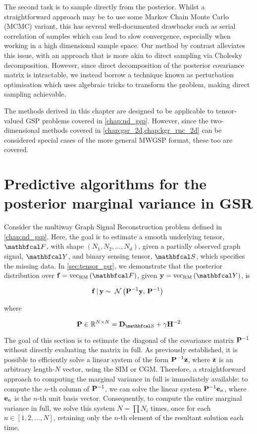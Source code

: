 The second task is to sample directly from the posterior. Whilst a straightforward approach may be to use some Markov Chain Monte Carlo (MCMC) variant, this has sevreal well-documented drawbacks such as serial correlation of samples which can lead to slow convergence, especially when working in a high dimensional sample space. Our method by contrast alleviates this issue, with an approach that is more akin to direct sampling via Cholesky decomposition. However, since direct decomposition of the posterior covariance matrix is intractable, we instead borrow a technique known as perturbation optimisation which uses algebraic tricks to transform the problem, making direct sampling achievable. 

The methods derived in this chapter are designed to be applicable to tensor-valued GSP problems covered in \cref{chap:nd_gsp}. However, since the two-dimensional methods covered in \cref{chap:gsr_2d,chap:kgr_rnc_2d} can be considered special cases of the more general MWGSP format, these too are covered. 

\section{Predictive algorithms for the posterior marginal variance in GSR}

Consider the multiway Graph Signal Reconstruction problem defined in \cref{chap:nd_gsp}. Here, the goal is to estimate a smooth underlying tensor, $\Ft$, with shape $(N_1, N_2, ..., N_d)$, given a partially observed graph signal, $\Yt$, and binary sensing tensor, $\St$, which specifies the missing data. In \cref{sec:tensor_gsr}, we demonstrate that the posterior distribution over $\f = \vecrm{\Ft}$, given $\y = \vecrm{\Yt}$, is

\begin{equation}
    \mathbf{f} \, | \, \mathbf{y} \sim \; \mathcal{N}\left(\mathbf{P}^{-1} \mathbf{y}, \, \mathbf{P}^{-1}\right) \;
\end{equation}

where 

\begin{equation}
    \PP \in \R^{N \times N} = \D_{\St} + \gamma \HH^{-2}
\end{equation}

The goal of this section is to estimate the diagonal of the covariance matrix $\mathbf{P}^{-1}$ without directly evaluating the matrix in full. As previously established, it is possible to efficiently solve a linear system of the form $\mathbf{P}^{-1} \mathbf{z}$, where $\mathbf{z}$ is an arbitrary length-$N$ vector, using the SIM or CGM. Therefore, a straightforward approach to computing the marginal variance in full is immediately available: to compute the $n$-th column of $\mathbf{P}^{-1}$, we can solve the linear system $\mathbf{P}^{-1} \mathbf{e}_n$, where $\mathbf{e}_n$ is the $n$-th unit basis vector. Consequently, to compute the entire marginal variance in full, we solve this system $N = \prod N_i$ times, once for each $n \in [1, 2, ..., N]$, retaining only the $n$-th element of the resultant solution each time.


